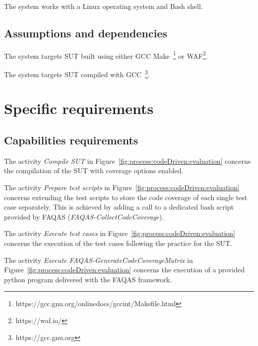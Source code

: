 \RQ{} The system works with a Linux operating system and Bash shell.



\subsection{Assumptions and dependencies}

\RQ{} The system targets SUT built using either GCC Make~\footnote{https://gcc.gnu.org/onlinedocs/gccint/Makefile.html} or WAF\footnote{https://waf.io/}.

\RQ{} The system targets SUT compiled with GCC~\footnote{https://gcc.gnu.org}.

\section{Specific requirements}
\subsection{Capabilities requirements}
\label{sec:rquirements:capabilities}


\RQ{} The activity \emph{Compile SUT} in Figure~\ref{fig:process:codeDriven:evaluation} concerns the compilation of  the SUT with coverage options enabled.

\RQ{} The activity \emph{Prepare test scripts} in Figure~\ref{fig:process:codeDriven:evaluation} concerns extending the test scripts to store the code coverage of each single test case separately. This is achieved by adding a call to a dedicated bash script provided by FAQAS (\emph{FAQAS-CollectCodeCoverage}).

\RQ{} The activity \emph{Execute test cases} in Figure~\ref{fig:process:codeDriven:evaluation} concerns the execution of the test cases following the practice for the SUT.

\RQ{} The activity \emph{Execute FAQAS-GenerateCodeCoverageMatrix} in Figure~\ref{fig:process:codeDriven:evaluation} concerns the execution of a provided python program delivered with the FAQAS framework.

